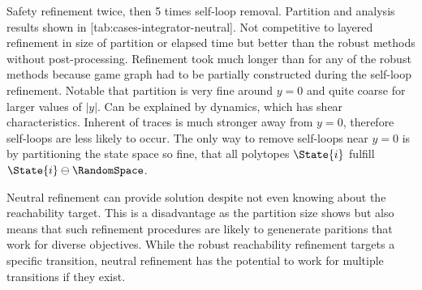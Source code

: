 \stopsubsection

\startsubsection[title={Neutral Refinement},reference=sec:cases-integrator-neutral]


    Safety refinement twice, then 5 times self-loop removal.
    Partition and analysis results shown in [tab:cases-integrator-neutral].
    Not competitive to layered refinement in size of partition or elapsed time but better than the robust methods without post-processing.
    Refinement took much longer than for any of the robust methods because game graph had to be partially constructed during the self-loop refinement.
    Notable that partition is very fine around $y = 0$ and quite coarse for larger values of $|y|$.
    Can be explained by dynamics, which has shear characteristics.
    Inherent  of traces is much stronger away from $y = 0$, therefore self-loops are less likely to occur.
    The only way to remove self-loops near $y = 0$ is by partitioning the state space so fine, that all polytopes $\State{i}$ fulfill $\State{i} \ominus \RandomSpace$.

    Neutral refinement can provide solution despite not even knowing about the reachability target.
    This is a disadvantage as the partition size shows but also means that such refinement procedures are likely to genenerate paritions that work for diverse objectives.
    While the robust reachability refinement targets a specific transition, neutral refinement has the potential to work for multiple transitions if they exist.

\stopsubsection

